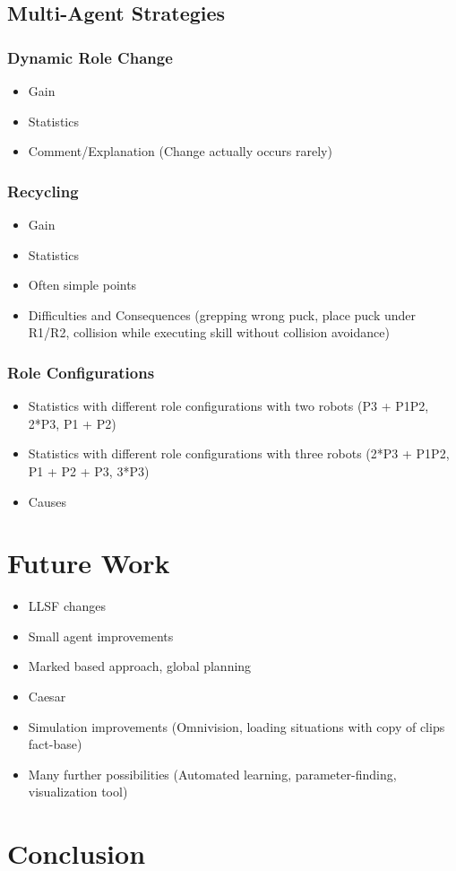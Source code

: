 \documentclass[a4paper,11pt]{article}
\begin{document}
\subsection{Multi-Agent Strategies}
\subsubsection{Dynamic Role Change}
\begin{itemize}
\item Gain
\item Statistics
\item Comment/Explanation (Change actually occurs rarely)
\end{itemize}
\subsubsection{Recycling}
\begin{itemize}
\item Gain
\item Statistics
\item Often simple points
\item Difficulties and Consequences (grepping wrong puck, place puck under R1/R2, collision while executing skill without collision avoidance)
\end{itemize}
\subsubsection{Role Configurations}
\begin{itemize}
\item Statistics with different role configurations with two robots (P3 + P1P2, 2*P3, P1 + P2)
\item Statistics with different role configurations with three robots (2*P3 + P1P2, P1 + P2 + P3, 3*P3)
\item Causes
\end{itemize}


\section{Future Work}
\begin{itemize}
\item LLSF changes
\item Small agent improvements
\item Marked based approach, global planning
\item Caesar
\item Simulation improvements (Omnivision, loading situations with copy of clips fact-base)
\item Many further possibilities (Automated learning, parameter-finding, visualization tool)
\end{itemize}

\section{Conclusion}



\end{document}
